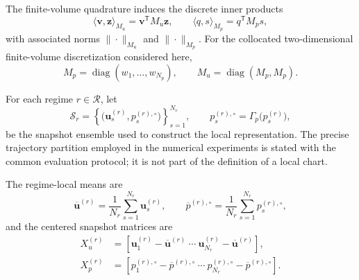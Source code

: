 The finite-volume quadrature induces the discrete inner products
\begin{equation}
  \langle \boldsymbol{v},\boldsymbol{z}\rangle_{M_u}
  =\boldsymbol{v}^{\mathsf T}M_u\boldsymbol{z},
  \qquad
  \langle q,s\rangle_{M_p}
  =q^{\mathsf T}M_p s,
  \label{eq:weighted_inner_products}
\end{equation}
with associated norms $\|\cdot\|_{M_u}$ and $\|\cdot\|_{M_p}$.  For the
collocated two-dimensional finite-volume discretization considered here,
\begin{equation}
  M_p=\operatorname{diag}(w_1,\ldots,w_{N_p}),
  \qquad
  M_u=\operatorname{diag}(M_p,M_p).
  \label{eq:velocity_pressure_mass_matrices}
\end{equation}

For each regime $r\in\mathcal{R}$, let
\begin{equation}
  \mathcal{S}_r
  =
  \left\{
    \bigl(\boldsymbol{u}^{(r)}_s,p^{(r),\circ}_s\bigr)
  \right\}_{s=1}^{N_r},
  \qquad
  p^{(r),\circ}_s=\Gamma_p\bigl(p^{(r)}_s\bigr),
  \label{eq:regime_snapshot_ensemble}
\end{equation}
be the snapshot ensemble used to construct the local representation.  The precise trajectory partition employed in the numerical experiments is
stated with the common evaluation protocol; it is not part of the definition
of a local chart.

The regime-local means are
\begin{equation}
  \overline{\boldsymbol{u}}^{(r)}
  =\frac{1}{N_r}\sum_{s=1}^{N_r}\boldsymbol{u}^{(r)}_s,
  \qquad
  \overline{p}^{(r),\circ}
  =\frac{1}{N_r}\sum_{s=1}^{N_r}p^{(r),\circ}_s,
  \label{eq:local_training_means}
\end{equation}
and the centered snapshot matrices are
\begin{align}
  X_u^{(r)}
  &=
  \left[
    \boldsymbol{u}^{(r)}_1-\overline{\boldsymbol{u}}^{(r)}
    \ \cdots\
    \boldsymbol{u}^{(r)}_{N_r}-\overline{\boldsymbol{u}}^{(r)}
  \right],
  \label{eq:centered_velocity_snapshots}\\
  X_p^{(r)}
  &=
  \left[
    p^{(r),\circ}_1-\overline{p}^{(r),\circ}
    \ \cdots\
    p^{(r),\circ}_{N_r}-\overline{p}^{(r),\circ}
  \right].
  \label{eq:centered_pressure_snapshots}
\end{align}


